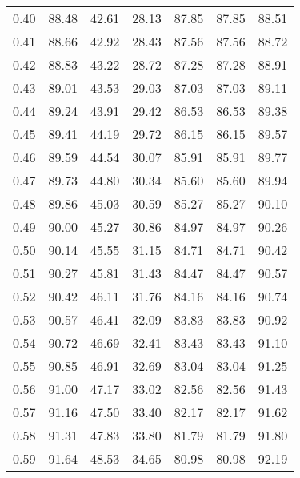 \begin{tabular}{|c|c|c|c|c|c|c|}
      0.40 &     88.48 &     42.61 &      28.13 &   87.85 &      87.85 &         88.51 \\
      0.41 &     88.66 &     42.92 &      28.43 &   87.56 &      87.56 &         88.72 \\
      0.42 &     88.83 &     43.22 &      28.72 &   87.28 &      87.28 &         88.91 \\
      0.43 &     89.01 &     43.53 &      29.03 &   87.03 &      87.03 &         89.11 \\
      0.44 &     89.24 &     43.91 &      29.42 &   86.53 &      86.53 &         89.38 \\
      0.45 &     89.41 &     44.19 &      29.72 &   86.15 &      86.15 &         89.57 \\
      0.46 &     89.59 &     44.54 &      30.07 &   85.91 &      85.91 &         89.77 \\
      0.47 &     89.73 &     44.80 &      30.34 &   85.60 &      85.60 &         89.94 \\
      0.48 &     89.86 &     45.03 &      30.59 &   85.27 &      85.27 &         90.10 \\
      0.49 &     90.00 &     45.27 &      30.86 &   84.97 &      84.97 &         90.26 \\
      0.50 &     90.14 &     45.55 &      31.15 &   84.71 &      84.71 &         90.42 \\
      0.51 &     90.27 &     45.81 &      31.43 &   84.47 &      84.47 &         90.57 \\
      0.52 &     90.42 &     46.11 &      31.76 &   84.16 &      84.16 &         90.74 \\
      0.53 &     90.57 &     46.41 &      32.09 &   83.83 &      83.83 &         90.92 \\
      0.54 &     90.72 &     46.69 &      32.41 &   83.43 &      83.43 &         91.10 \\
      0.55 &     90.85 &     46.91 &      32.69 &   83.04 &      83.04 &         91.25 \\
      0.56 &     91.00 &     47.17 &      33.02 &   82.56 &      82.56 &         91.43 \\
      0.57 &     91.16 &     47.50 &      33.40 &   82.17 &      82.17 &         91.62 \\
      0.58 &     91.31 &     47.83 &      33.80 &   81.79 &      81.79 &         91.80 \\
      0.59 &     91.64 &     48.53 &      34.65 &   80.98 &      80.98 &         92.19 \\

\end{tabular}
